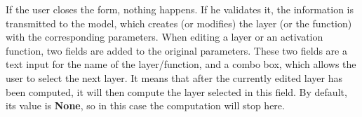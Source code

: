 If the user closes the form, nothing happens. If he validates it, the information is transmitted to the model, which creates (or modifies) the layer (or the function) with the corresponding parameters.
\newline When editing a layer or an activation function, two fields are added to the original parameters. These two fields are a text input for the name of the layer/function, and a combo box, which allows the user to select the next layer. It means that after the currently edited layer has been computed, it will then compute the layer selected in this field. By default, its value is \textbf{None}, so in this case the computation will stop here.